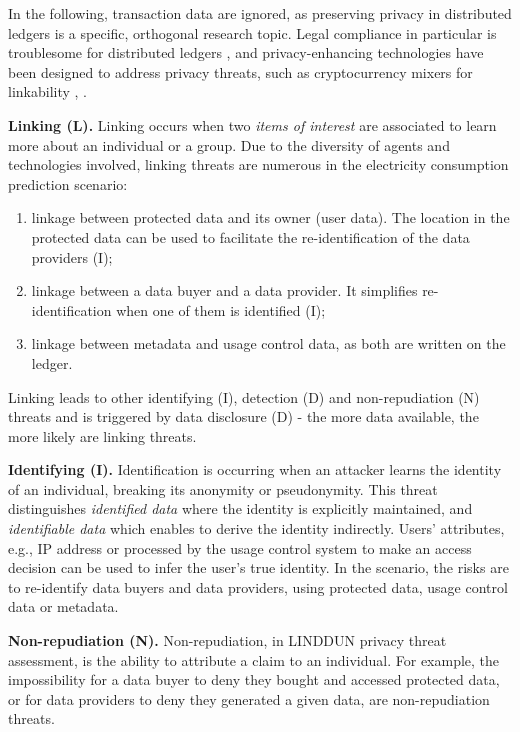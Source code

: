 In the following, transaction data are ignored, as preserving privacy in distributed ledgers is a specific, orthogonal research topic. Legal compliance in particular is troublesome for distributed ledgers \cite{Haque2021}, and privacy-enhancing technologies have been designed to address privacy threats, such as cryptocurrency mixers for linkability \cite{Sarfraz2019}, \cite{Glaeser2022}.


\textbf{Linking (L).} Linking occurs when two \emph{items of interest} are associated to learn more about an individual or a group. Due to the diversity of agents and technologies involved, linking threats are numerous in the electricity consumption prediction scenario:

\begin{enumerate}
    \item linkage between protected data and its owner (user data). The location in the protected data can be used to facilitate the re-identification of the data providers (I);
    \item linkage between a data buyer and a data provider. It simplifies re-identification when one of them is identified (I);
    \item linkage between metadata and usage control data, as both are written on the ledger.
\end{enumerate}

Linking leads to other identifying (I), detection (D) and non-repudiation (N) threats and is triggered by data disclosure (D) - the more data available, the more likely are linking threats.

\textbf{Identifying (I).} Identification is occurring when an attacker learns the identity of an individual, breaking its anonymity or pseudonymity. This threat distinguishes \emph{identified data} where the identity is explicitly maintained, and \emph{identifiable data} which enables to derive the identity indirectly. Users' attributes, e.g., IP address or processed by the usage control system to make an access decision can be used to infer the user's true identity. In the scenario, the risks are to re-identify data buyers and data providers, using protected data, usage control data or metadata.

\textbf{Non-repudiation (N).} Non-repudiation, in LINDDUN privacy threat assessment, is the ability to attribute a claim to an individual. For example, the impossibility for a data buyer to deny they bought and accessed protected data, or for data providers to deny they generated a given data, are non-repudiation threats.

